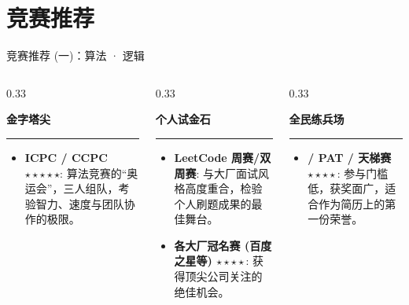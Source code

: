 \documentclass{beamer}
\begin{document}
\section{竞赛推荐}
\begin{frame}{竞赛推荐 (一)：算法 · 逻辑}
    \begin{columns}[T]
        \begin{column}{0.33\textwidth}
            \begin{center}
                \Large\textbf{金字塔尖} \\
                \rule{\linewidth}{0.4pt}
            \end{center}
            \begin{itemize}
                \item \textbf{ICPC / CCPC $\star \star \star \star \star$}: \small 算法竞赛的“奥运会”，三人组队，考验智力、速度与团队协作的极限。
            \end{itemize}
        \end{column}
        
        \begin{column}{0.33\textwidth}
            \begin{center}
                \Large\textbf{个人试金石} \\
                \rule{\linewidth}{0.4pt}
            \end{center}
            \begin{itemize}
                \item \textbf{LeetCode 周赛/双周赛}: \small 与大厂面试风格高度重合，检验个人刷题成果的最佳舞台。
                \item \textbf{各大厂冠名赛 (百度之星等) $\star \star \star \star$}: \small 获得顶尖公司关注的绝佳机会。
            \end{itemize}
        \end{column}
        
        \begin{column}{0.33\textwidth}
            \begin{center}
                \Large\textbf{全民练兵场} \\
                \rule{\linewidth}{0.4pt}
            \end{center}
            \begin{itemize}
                \item \textbf{ / PAT / 天梯赛 $\star \star \star \star$}: \small \alert{参与门槛低，获奖面广}，适合作为简历上的第一份荣誉。
            \end{itemize}
        \end{column}
    \end{columns}
\end{frame}
\end{document}
